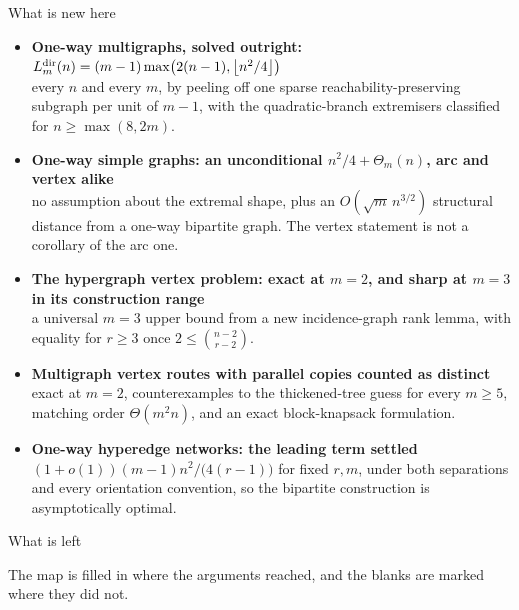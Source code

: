 \documentclass[aspectratio=1610,11pt]{beamer}
\begin{document}
\begin{frame}{What is new here}
\vfill
\small
\begin{itemize}\setlength{\itemsep}{4pt}
  \item[\color{KULblauw1}\textbf{1}] \textbf{One-way multigraphs, solved outright: $L_m^{\mathrm{dir}}(n)=(m-1)\max\bigl(2(n-1),\left\lfloor n^2/4\right\rfloor\bigr)$}\\
        {\footnotesize\color{black!60} every $n$ and every $m$, by peeling off one sparse reachability-preserving subgraph per unit of $m-1$, with the quadratic-branch extremisers classified for $n\ge\max(8,2m)$.}
  \item[\color{KULblauw1}\textbf{2}] \textbf{One-way simple graphs: an unconditional $n^2/4+\Theta_m(n)$, arc and vertex alike}\\
        {\footnotesize\color{black!60} no assumption about the extremal shape, plus an $O(\sqrt{m}\,n^{3/2})$ structural distance from a one-way bipartite graph. The vertex statement is not a corollary of the arc one.}
  \item[\color{KULblauw1}\textbf{3}] \textbf{The hypergraph vertex problem: exact at $m=2$, and sharp at $m=3$ in its construction range}\\
        {\footnotesize\color{black!60} a universal $m=3$ upper bound from a new incidence-graph rank lemma, with equality for $r\ge3$ once $2\le\binom{n-2}{r-2}$.}
  \item[\color{KULblauw1}\textbf{4}] \textbf{Multigraph vertex routes with parallel copies counted as distinct}\\
        {\footnotesize\color{black!60} exact at $m=2$, counterexamples to the thickened-tree guess for every $m\ge5$, matching order $\Theta(m^2n)$, and an exact block-knapsack formulation.}
  \item[\color{KULblauw1}\textbf{5}] \textbf{One-way hyperedge networks: the leading term settled}\\
        {\footnotesize\color{black!60} $(1+o(1))(m-1)n^2/\bigl(4(r-1)\bigr)$ for fixed $r,m$, under both separations and every orientation convention, so the bipartite construction is asymptotically optimal.}
\end{itemize}
\vfill
\end{frame}

\begin{frame}{What is left}
\vfill
\centering
{}

\vspace{10pt}
{\color{black!55}\small The map is filled in where the arguments reached, and the blanks are marked where they did not.}
\vfill
\end{frame}
\end{document}
